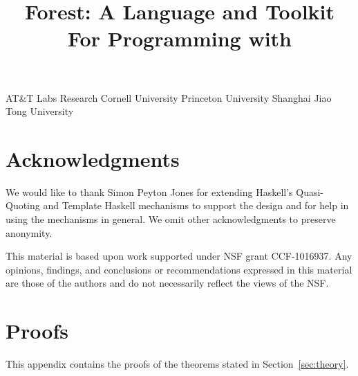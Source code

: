 \documentclass[nocopyrightspace,natbib,preprint]{sigplanconf}
\newif\ifanon\anonfalse  %
\begin{document}


\copyrightdata{} 

\title{Forest: A Language and Toolkit For Programming with \Filestores{}}

\ifanon
\authorinfo{\vskip -2in}
 	   {\vskip -2in}
           {}
\else
{}
	   {AT\&T Labs Research}{}
           {Cornell University}{}
           {Princeton University}{}
           {Shanghai Jiao Tong University}{}
\fi

\maketitle{}

\begin{abstract}  

\end{abstract}













\ifanon
\else
\section*{Acknowledgments}
We would like to thank Simon Peyton Jones for extending Haskell's
Quasi-Quoting and Template Haskell mechanisms to support the \forest{}
design and for help in using the mechanisms in general. We omit other
acknowledgments to preserve anonymity.

This material is based upon work supported under NSF grant
CCF-1016937.  Any opinions, findings, and conclusions or
recommendations expressed in this material are those of the authors
and do not necessarily reflect the views of the NSF.
\fi





\ifanon
\else
\onecolumn
\newpage
\appendix

\closeproofchan
\section{Proofs}

\noindent This appendix contains the proofs of the theorems stated in
Section~\ref{sec:theory}.

\label{sec:proof-appendix}



\fi
\end{document}
